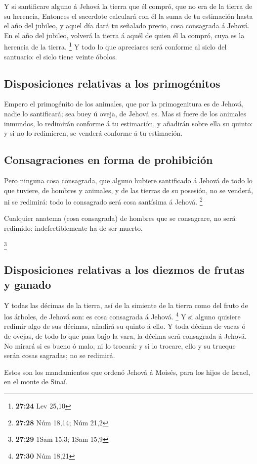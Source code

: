  Y si santificare alguno á Jehová la tierra que él compró,
que no era de la tierra de su herencia,  Entonces el
sacerdote calculará con él la suma de tu estimación hasta el año del
jubileo, y aquel día dará tu señalado precio, cosa consagrada á Jehová.
 En el año del jubileo, volverá la tierra á aquél de quien
él la compró, cuya es la herencia de la tierra. \footnote{\textbf{27:24}
  Lev 25,10}  Y todo lo que apreciares será conforme al
siclo del santuario: el siclo tiene veinte óbolos.

\hypertarget{disposiciones-relativas-a-los-primoguxe9nitos}{%
\subsection{Disposiciones relativas a los
primogénitos}\label{disposiciones-relativas-a-los-primoguxe9nitos}}

 Empero el primogénito de los animales, que por la
primogenitura es de Jehová, nadie lo santificará; sea buey ú oveja, de
Jehová es.  Mas si fuere de los animales inmundos, lo
redimirán conforme á tu estimación, y añadirán sobre ella su quinto: y
si no lo redimieren, se venderá conforme á tu estimación.

\hypertarget{consagraciones-en-forma-de-prohibiciuxf3n}{%
\subsection{Consagraciones en forma de
prohibición}\label{consagraciones-en-forma-de-prohibiciuxf3n}}

 Pero ninguna cosa consagrada, que alguno hubiere
santificado á Jehová de todo lo que tuviere, de hombres y animales, y de
las tierras de su posesión, no se venderá, ni se redimirá: todo lo
consagrado será cosa santísima á Jehová. \footnote{\textbf{27:28} Núm
  18,14; Núm 21,2}

 Cualquier anatema (cosa consagrada) de hombres que se
consagrare, no será redimido: indefectiblemente ha de ser muerto.

\footnote{\textbf{27:29} 1Sam 15,3; 1Sam 15,9}

\hypertarget{disposiciones-relativas-a-los-diezmos-de-frutas-y-ganado}{%
\subsection{Disposiciones relativas a los diezmos de frutas y
ganado}\label{disposiciones-relativas-a-los-diezmos-de-frutas-y-ganado}}

 Y todas las décimas de la tierra, así de la simiente de la
tierra como del fruto de los árboles, de Jehová son: es cosa consagrada
á Jehová. \footnote{\textbf{27:30} Núm 18,21}  Y si alguno
quisiere redimir algo de sus décimas, añadirá su quinto á ello.
 Y toda décima de vacas ó de ovejas, de todo lo que pasa
bajo la vara, la décima será consagrada á Jehová.  No
mirará si es bueno ó malo, ni lo trocará: y si lo trocare, ello y su
trueque serán cosas sagradas; no se redimirá.

 Estos son los mandamientos que ordenó Jehová á Moisés,
para los hijos de Israel, en el monte de Sinaí.
